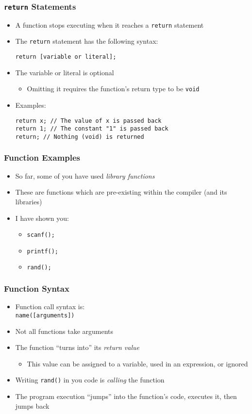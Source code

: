 \documentclass[14pt]{beamer}
\begin{document}
\begin{frame}[fragile]
\frametitle{\texttt{return} Statements}
\begin{itemize}
\item A function stops executing when it reaches a \texttt{return} statement
\item The \texttt{return} statement has the following syntax:
\begin{lstlisting}
return [variable or literal];
\end{lstlisting}
\item The variable or literal is optional
	\begin{itemize}
		\item Omitting it requires the function's return type to be \texttt{void}
	\end{itemize}
\item Examples:
\begin{lstlisting}[style=CStyle]
return x; // The value of x is passed back
return 1; // The constant "1" is passed back
return; // Nothing (void) is returned
\end{lstlisting}
\end{itemize}
\end{frame}

\begin{frame}
\frametitle{Function Examples}
\begin{itemize}
\item So far, some of you have used \textit{library functions}
\item These are functions which are pre-existing within the compiler (and its libraries)
\item I have shown you:
	\begin{itemize}
		\item \texttt{scanf();}
		\item \texttt{printf();}
		\item \texttt{rand();}
	\end{itemize}
\end{itemize}
\end{frame}

\begin{frame}[fragile]
\frametitle{Function Syntax}
\begin{itemize}
\item Function call syntax is:\\
{\small \texttt{name([arguments])} }
\item Not all functions take arguments
\item The function ``turns into'' its \textit{return value}
	\begin{itemize}
		\item This value can be assigned to a variable, used in an expression, or ignored
	\end{itemize}
\pause
\item Writing \texttt{rand()} in you code is \textit{calling} the function
\item The program execution ``jumps'' into the function's code, executes it, then jumps back
\end{itemize}
\end{frame}
\end{document}
